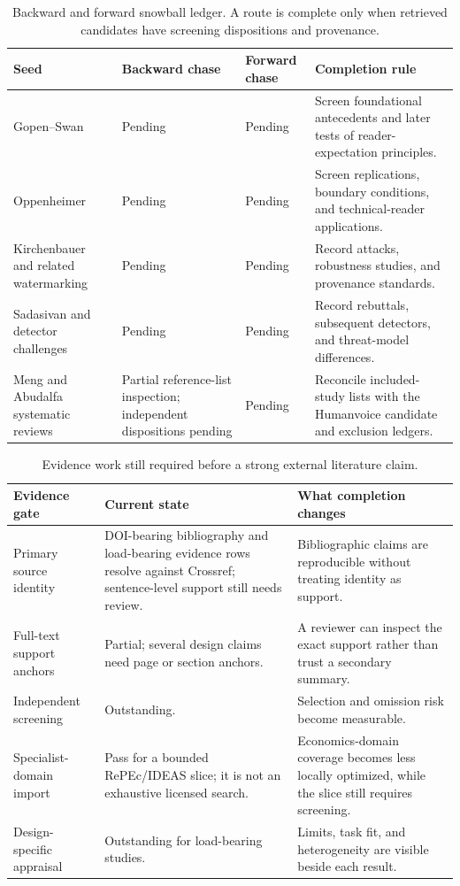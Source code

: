 \begin{table}[H]
\centering
\small
\begin{tabularx}{\textwidth}{@{}p{}p{}p{}L@{}}
\toprule
Seed & Backward chase & Forward chase & Completion rule \\
\midrule
Gopen--Swan & Pending & Pending & Screen foundational antecedents and later
tests of reader-expectation principles. \\
Oppenheimer & Pending & Pending & Screen replications, boundary conditions,
and technical-reader applications. \\
Kirchenbauer and related watermarking & Pending & Pending & Record attacks,
robustness studies, and provenance standards. \\
Sadasivan and detector challenges & Pending & Pending & Record rebuttals,
subsequent detectors, and threat-model differences. \\
Meng and Abudalfa systematic reviews & Partial reference-list inspection;
independent dispositions pending & Pending & Reconcile included-study lists
with the Humanvoice candidate and exclusion ledgers. \\
\bottomrule
\end{tabularx}
\caption{Backward and forward snowball ledger. A route is complete only when
retrieved candidates have screening dispositions and provenance.}
\label{tab:snowball-ledger}
\end{table}

\begin{table}[H]
\centering
\small
\begin{tabularx}{\textwidth}{@{}p{}p{}L@{}}
\toprule
Evidence gate & Current state & What completion changes \\
\midrule
Primary source identity & DOI-bearing bibliography and load-bearing evidence
rows resolve against Crossref; sentence-level support still needs review. &
Bibliographic claims are reproducible without treating identity as support. \\
Full-text support anchors & Partial; several design claims need page or
section anchors. & A reviewer can inspect the exact support rather than trust a
secondary summary. \\
Independent screening & Outstanding. & Selection and omission risk become
measurable. \\
Specialist-domain import & Pass for a bounded RePEc/IDEAS slice; it is not an
exhaustive licensed search. & Economics-domain coverage becomes less locally
optimized, while the slice still requires screening. \\
Design-specific appraisal & Outstanding for load-bearing studies. & Limits,
task fit, and heterogeneity are visible beside each result. \\
\bottomrule
\end{tabularx}
\caption{Evidence work still required before a strong external literature claim.}
\label{tab:evidence-gates-expanded}
\end{table}

